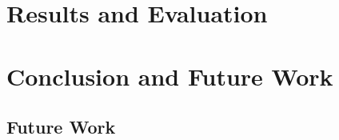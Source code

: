 \documentclass[a4paper,12pt]{article}
\begin{document}
\section{Results and Evaluation}


\section{Conclusion and Future Work}

\subsection{Future Work}


\end{document}
